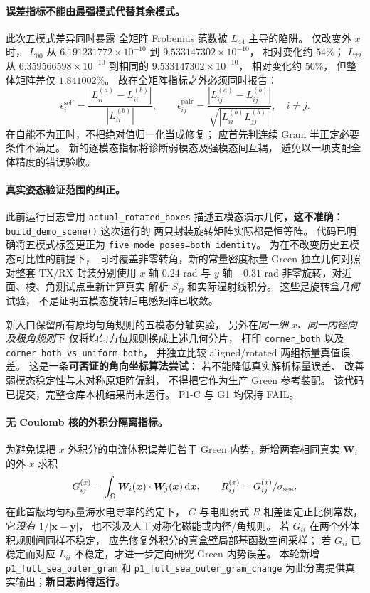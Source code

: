 \paragraph{误差指标不能由最强模式代替其余模式。}
此次五模式差异同时暴露
全矩阵 Frobenius 范数被 $L_{44}$ 主导的陷阱。
仅改变外 $x$ 时，
$L_{00}$ 从 $6.191231772\times10^{-10}$
到 $9.533147302\times10^{-10}$，
相对变化约 $54\%$；
$L_{22}$ 从 $6.359566598\times10^{-10}$
到相同的 $9.533147302\times10^{-10}$，
相对变化约 $50\%$，
但整体矩阵差仅 $1.841002\%$。
故在全矩阵指标之外必须同时报告：
\begin{equation}
 \epsilon_i^{\mathrm{self}}=
 \frac{|L_{ii}^{(a)}-L_{ii}^{(b)}|}{|L_{ii}^{(b)}|},\qquad
 \epsilon_{ij}^{\mathrm{pair}}=
 \frac{|L_{ij}^{(a)}-L_{ij}^{(b)}|}
 {\sqrt{|L_{ii}^{(b)}L_{jj}^{(b)}|}},\quad i\ne j.
\end{equation}
在自能不为正时，不把绝对值归一化当成修复；
应首先判连续 Gram 半正定必要条件不满足。
新的逐模态指标将诊断弱模态及强模态间互耦，
避免以一项支配全体精度的错误验收。

\paragraph{真实姿态验证范围的纠正。}
此前运行日志曾用 \texttt{actual\_rotated\_boxes}
描述五模态演示几何，\textbf{这不准确}：
\texttt{build\_demo\_scene()} 这次运行的
两只封装旋转矩阵实际都是恒等阵。
代码已明确将五模式标签更正为
\texttt{five\_mode\_poses=both\_identity}。
为在不改变历史五模态可比性的前提下，
同时覆盖非零转角，新的常量密度标量 Green
独立几何对照对整套 TX/RX 封装分别使用
$x$ 轴 $0.24$ rad 与 $y$ 轴 $-0.31$ rad
非零旋转，对近面、棱、角测试点重新计算真实
解析 $S_\Omega$ 和实际湿射线积分。
这些是旋转盒\emph{几何}试验，
不是证明五模态旋转后电感矩阵已收敛。

新入口保留所有原均匀角规则的五模态分轴实验，
另外在\emph{同一细 $x$、同一内径向及极角规则}下
仅将均匀方位规则换成上述几何分片，
打印 \texttt{corner\_both} 以及
\texttt{corner\_both\_vs\_uniform\_both}，
并独立比较 aligned/rotated 两组标量真值误差。
这是一条\textbf{可否证的角向坐标算法尝试}：
若不能降低真实解析标量误差、
改善弱模态稳定性与未对称原矩阵偏斜，
不得把它作为生产 Green 参考装配。
该代码已提交，完整仓库本机结果尚未运行。
P1-C 与 G1 均保持 FAIL。


\paragraph{无 Coulomb 核的外积分隔离指标。}
为避免误把 $x$ 外积分的电流体积误差归咎于 Green
内势，新增两套相同真实 $\bm W_i$ 的外 $x$ 求积
\begin{equation}
 G^{(x)}_{ij}=\int_\Omega\bm W_i(\bm x)\cdot
 \bm W_j(\bm x)\,\mathrm d\bm x,
 \qquad R^{(x)}_{ij}=G^{(x)}_{ij}/\sigma_{\rm sea}.
\end{equation}
在此首版均匀标量海水电导率的约定下，
$G$ 与电阻弱式 $R$ 相差固定正比例常数，
它\emph{没有} $1/|\bm x-\bm y|$，
也不涉及人工对称化磁能或内径/角规则。
若 $G_{ii}$ 在两个外体积规则间同样不稳定，
应先修复外积分的真盒壁局部基函数空间采样；
若 $G_{ii}$ 已稳定而对应 $L_{ii}$
不稳定，才进一步定向研究 Green 内势误差。
本轮新增 \texttt{p1\_full\_sea\_outer\_gram} 和
\texttt{p1\_full\_sea\_outer\_gram\_change}
为此分离提供真实输出；\textbf{新日志尚待运行}。


